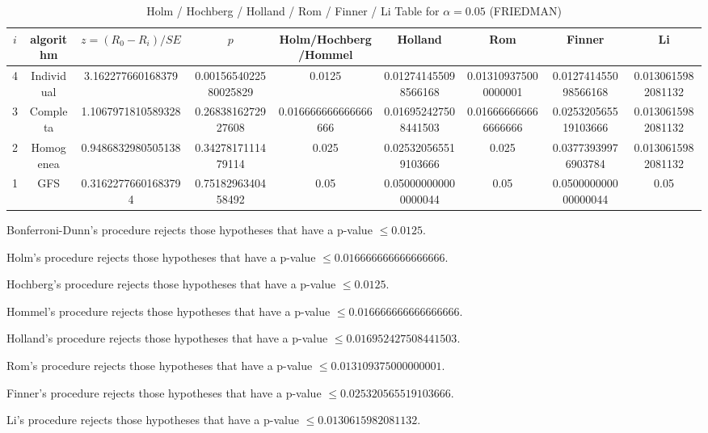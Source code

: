\documentclass[a4paper,10pt]{article}
\begin{document}
\begin{landscape}
\begin{table}[!htp]
\centering\scriptsize
\caption{Holm / Hochberg / Holland / Rom / Finner / Li Table for $\alpha=0.05$ (FRIEDMAN)}
\begin{tabular}{ccccccccc}
$i$&algorithm&$z=(R_0 - R_i)/SE$&$p$&Holm/Hochberg/Hommel&Holland&Rom&Finner&Li\\
\hline
4&Individual&3.162277660168379&0.0015654022580025829&0.0125&0.012741455098566168&0.013109375000000001&0.012741455098566168&0.0130615982081132\\
3&Completa&1.1067971810589328&0.2683816272927608&0.016666666666666666&0.016952427508441503&0.016666666666666666&0.025320565519103666&0.0130615982081132\\
2&Homogenea&0.9486832980505138&0.3427817111479114&0.025&0.025320565519103666&0.025&0.03773939976903784&0.0130615982081132\\
1&GFS&0.31622776601683794&0.7518296340458492&0.05&0.050000000000000044&0.05&0.050000000000000044&0.05\\
\hline
\end{tabular}
\end{table}
Bonferroni-Dunn's procedure rejects those hypotheses that have a p-value $\le0.0125$.


Holm's procedure rejects those hypotheses that have a p-value $\le0.016666666666666666$.


Hochberg's procedure rejects those hypotheses that have a p-value $\le0.0125$.


Hommel's procedure rejects those hypotheses that have a p-value $\le0.016666666666666666$.


Holland's procedure rejects those hypotheses that have a p-value $\le0.016952427508441503$.


Rom's procedure rejects those hypotheses that have a p-value $\le0.013109375000000001$.


Finner's procedure rejects those hypotheses that have a p-value $\le0.025320565519103666$.


Li's procedure rejects those hypotheses that have a p-value $\le0.0130615982081132$.



\newpage


\end{landscape}
\end{document}
